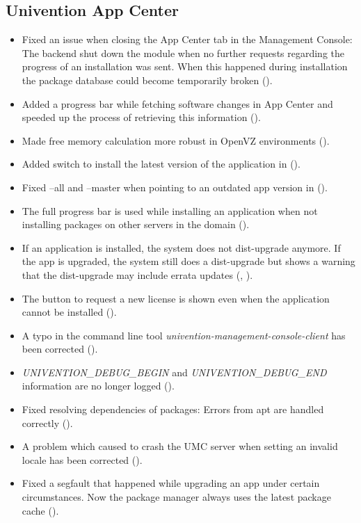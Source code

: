 
\subsection{Univention App Center}
\begin{itemize}
\item Fixed an issue when closing the App Center tab in the Management Console:
  The backend shut down the module when no further requests regarding the
  progress of an installation was sent. When this happened during installation
  the package database could become temporarily broken ().
\item Added a progress bar while fetching software changes in App Center and
  speeded up the process of retrieving this information ().
\item Made free memory calculation more robust in OpenVZ environments
  ().
\item Added switch to install the latest version of the application in
   ().
\item Fixed --all and --master when pointing to an outdated app version in
   ().
\item The full progress bar is used while installing an application when not
  installing packages on other servers in the domain ().
\item If an application is installed, the system does not dist-upgrade anymore.
  If the app is upgraded, the system still does a dist-upgrade but shows a
  warning that the dist-upgrade may include errata updates (,
  ).
\item The button to request a new license is shown even when the application
  cannot be installed ().
\item A typo in the command line tool
  \emph{univention-management-console-client} has been corrected
  ().
\item \emph{UNIVENTION\_DEBUG\_BEGIN} and \emph{UNIVENTION\_DEBUG\_END}
  information are no longer logged ().
\item Fixed resolving dependencies of packages: Errors from apt are handled
  correctly ().
\item A problem which caused to crash the UMC server when setting an
  invalid locale has been corrected ().
\item Fixed a segfault that happened while upgrading an app under certain
  circumstances. Now the package manager always uses the latest package cache
  ().
\end{itemize}

